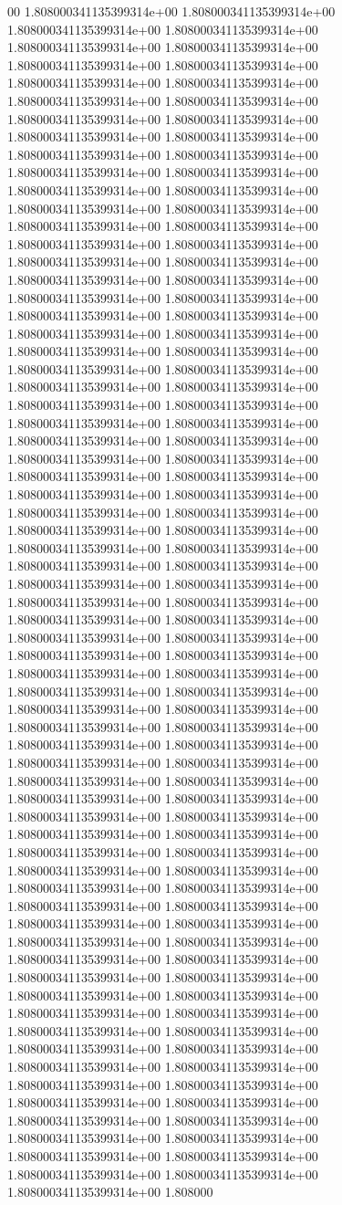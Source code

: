 00	1.808000341135399314e+00	1.808000341135399314e+00	1.808000341135399314e+00	1.808000341135399314e+00	1.808000341135399314e+00	1.808000341135399314e+00	1.808000341135399314e+00	1.808000341135399314e+00	1.808000341135399314e+00	1.808000341135399314e+00	1.808000341135399314e+00	1.808000341135399314e+00	1.808000341135399314e+00	1.808000341135399314e+00	1.808000341135399314e+00	1.808000341135399314e+00	1.808000341135399314e+00	1.808000341135399314e+00	1.808000341135399314e+00	1.808000341135399314e+00	1.808000341135399314e+00	1.808000341135399314e+00	1.808000341135399314e+00	1.808000341135399314e+00	1.808000341135399314e+00	1.808000341135399314e+00	1.808000341135399314e+00	1.808000341135399314e+00	1.808000341135399314e+00	1.808000341135399314e+00	1.808000341135399314e+00	1.808000341135399314e+00	1.808000341135399314e+00	1.808000341135399314e+00	1.808000341135399314e+00	1.808000341135399314e+00	1.808000341135399314e+00	1.808000341135399314e+00	1.808000341135399314e+00	1.808000341135399314e+00	1.808000341135399314e+00	1.808000341135399314e+00	1.808000341135399314e+00	1.808000341135399314e+00	1.808000341135399314e+00	1.808000341135399314e+00	1.808000341135399314e+00	1.808000341135399314e+00	1.808000341135399314e+00	1.808000341135399314e+00	1.808000341135399314e+00	1.808000341135399314e+00	1.808000341135399314e+00	1.808000341135399314e+00	1.808000341135399314e+00	1.808000341135399314e+00	1.808000341135399314e+00	1.808000341135399314e+00	1.808000341135399314e+00	1.808000341135399314e+00	1.808000341135399314e+00	1.808000341135399314e+00	1.808000341135399314e+00	1.808000341135399314e+00	1.808000341135399314e+00	1.808000341135399314e+00	1.808000341135399314e+00	1.808000341135399314e+00	1.808000341135399314e+00	1.808000341135399314e+00	1.808000341135399314e+00	1.808000341135399314e+00	1.808000341135399314e+00	1.808000341135399314e+00	1.808000341135399314e+00	1.808000341135399314e+00	1.808000341135399314e+00	1.808000341135399314e+00	1.808000341135399314e+00	1.808000341135399314e+00	1.808000341135399314e+00	1.808000341135399314e+00	1.808000341135399314e+00	1.808000341135399314e+00	1.808000341135399314e+00	1.808000341135399314e+00	1.808000341135399314e+00	1.808000341135399314e+00	1.808000341135399314e+00	1.808000341135399314e+00	1.808000341135399314e+00	1.808000341135399314e+00	1.808000341135399314e+00	1.808000341135399314e+00	1.808000341135399314e+00	1.808000341135399314e+00	1.808000341135399314e+00	1.808000341135399314e+00	1.808000341135399314e+00	1.808000341135399314e+00	1.808000341135399314e+00	1.808000341135399314e+00	1.808000341135399314e+00	1.808000341135399314e+00	1.808000341135399314e+00	1.808000341135399314e+00	1.808000341135399314e+00	1.808000341135399314e+00	1.808000341135399314e+00	1.808000341135399314e+00	1.808000341135399314e+00	1.808000341135399314e+00	1.808000341135399314e+00	1.808000341135399314e+00	1.808000341135399314e+00	1.808000341135399314e+00	1.808000341135399314e+00	1.808000341135399314e+00	1.808000341135399314e+00	1.808000341135399314e+00	1.808000341135399314e+00	1.808000341135399314e+00	1.808000341135399314e+00	1.808000341135399314e+00	1.808000341135399314e+00	1.808000341135399314e+00	1.808000341135399314e+00	1.808000341135399314e+00	1.808000341135399314e+00	1.808000341135399314e+00	1.808000341135399314e+00	1.808000341135399314e+00	1.808000341135399314e+00	1.808000